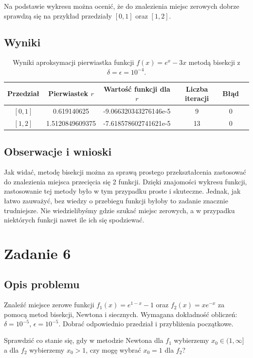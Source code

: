 \documentclass{article}
\begin{document}
Na podstawie wykresu można ocenić, że do znalezienia miejsc zerowych dobrze sprawdzą się na przykład przedziały $[0, 1]$ oraz $[1, 2]$.

\subsection{Wyniki}
\begin{table}[H]
\begin{adjustbox}{center}
\begin{tabular}{|c|c|c|c|c|c|}
    \hline
    Przedział & Pierwiastek $r$ & Wartość funkcji dla $r$ & Liczba iteracji & Błąd\\
    \hline
    $[0, 1]$ & 0.619140625 & -9.066320343276146e-5 & 9 & 0\\
    \hline
    $[1, 2]$ & 1.5120849609375 & -7.618578602741621e-5 & 13 & 0\\
    \hline
\end{tabular}
\end{adjustbox}
\caption{Wyniki aproksymacji pierwiastka funkcji $f(x) = e^x - 3x$ metodą bisekcji z $\delta = \epsilon = 10^{-4}$.}
\end{table}

\subsection{Obserwacje i wnioski}
Jak widać, metodę bisekcji można za sprawą prostego przekształcenia zastosować do znalezienia miejsca przecięcia się 2 funkcji.
Dzięki znajomości wykresu funkcji, zastosowanie tej metody było w tym przypadku proste i skuteczne.
Jednak, jak łatwo zauważyć, bez wiedzy o przebiegu funkcji byłoby to zadanie znacznie trudniejsze.
Nie wiedzielibyśmy gdzie szukać miejsc zerowych, a w przypadku niektórych funkcji nawet ile ich się spodziewać.

\section{Zadanie 6}
\subsection{Opis problemu}
Znaleźć miejsce zerowe funkcji \( f_1(x) = e^{1-x} - 1 \) oraz \( f_2(x) = x e^{-x} \) za pomocą metod bisekcji, Newtona i siecznych. Wymagana dokładność obliczeń: \( \delta = 10^{-5} \), \( \epsilon = 10^{-5} \).
Dobrać odpowiednio przedział i przybliżenia początkowe.

Sprawdzić co stanie się, gdy w metodzie Newtona dla \( f_1 \) wybierzemy \( x_0 \in (1, \infty] \) a dla \( f_2 \) wybierzemy \( x_0 > 1 \), czy mogę wybrać \( x_0 = 1 \) dla \( f_2 \)?
\end{document}
